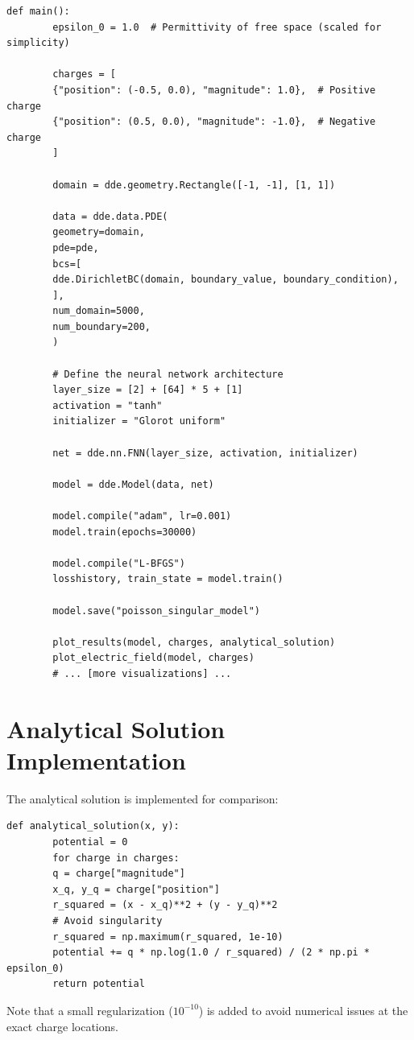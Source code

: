 \documentclass[12pt,a4paper]{report}
\begin{document}
	\begin{lstlisting}[caption={Main function implementing the PINN solution}]
		def main():
		epsilon_0 = 1.0  # Permittivity of free space (scaled for simplicity)
		
		charges = [
		{"position": (-0.5, 0.0), "magnitude": 1.0},  # Positive charge
		{"position": (0.5, 0.0), "magnitude": -1.0},  # Negative charge
		]
		
		domain = dde.geometry.Rectangle([-1, -1], [1, 1])
		
		data = dde.data.PDE(
		geometry=domain,
		pde=pde,
		bcs=[
		dde.DirichletBC(domain, boundary_value, boundary_condition),
		],
		num_domain=5000,
		num_boundary=200,
		)
		
		# Define the neural network architecture
		layer_size = [2] + [64] * 5 + [1]
		activation = "tanh"
		initializer = "Glorot uniform"
		
		net = dde.nn.FNN(layer_size, activation, initializer)
		
		model = dde.Model(data, net)
		
		model.compile("adam", lr=0.001)
		model.train(epochs=30000)
		
		model.compile("L-BFGS")
		losshistory, train_state = model.train()
		
		model.save("poisson_singular_model")
		
		plot_results(model, charges, analytical_solution)
		plot_electric_field(model, charges)
		# ... [more visualizations] ...
	\end{lstlisting}
	
	\section{Analytical Solution Implementation}
	The analytical solution is implemented for comparison:
	
	\begin{lstlisting}[caption={Analytical solution for comparison}]
		def analytical_solution(x, y):
		potential = 0
		for charge in charges:
		q = charge["magnitude"]
		x_q, y_q = charge["position"]
		r_squared = (x - x_q)**2 + (y - y_q)**2
		# Avoid singularity
		r_squared = np.maximum(r_squared, 1e-10)
		potential += q * np.log(1.0 / r_squared) / (2 * np.pi * epsilon_0)
		return potential
	\end{lstlisting}
	
	Note that a small regularization ($10^{-10}$) is added to avoid numerical issues at the exact charge locations.
	
\end{document}
